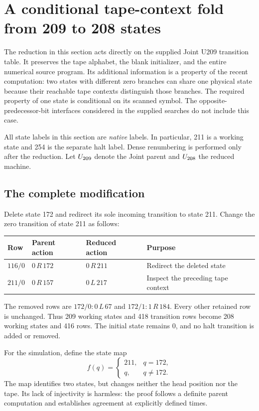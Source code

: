 \section{A conditional tape-context fold from 209 to 208 states}
\label{sec:local208}

The reduction in this section acts directly on the supplied Joint U209
transition table. It preserves the tape alphabet, the blank initializer, and
the entire numerical source program. Its additional information is a property
of the recent computation: two states with different zero branches can share
one physical state because their reachable tape contexts distinguish those
branches. The required property of one state is conditional on its scanned
symbol. The opposite-predecessor-bit interfaces considered in the supplied
searches do not include this case.

All state labels in this section are \emph{native} labels. In particular, 211
is a working state and 254 is the separate halt label. Dense renumbering is
performed only after the reduction. Let $U_{209}$ denote the Joint parent and
$U_{208}$ the reduced machine.

\subsection{The complete modification}
\label{subsec:local208-patch}

Delete state 172 and redirect its sole incoming transition to state 211.
Change the zero transition of state 211 as follows:
\begin{center}
\begin{tabular}{llll}
\toprule
Row & Parent action & Reduced action & Purpose\\
\midrule
$116/0$ & $0\,R\,172$ & $0\,R\,211$ & Redirect the deleted state\\
$211/0$ & $0\,R\,157$ & $0\,L\,217$ & Inspect the preceding tape context\\
\bottomrule
\end{tabular}
\end{center}
The removed rows are $172/0:0\,L\,67$ and $172/1:1\,R\,184$.
Every other retained row is unchanged. Thus 209 working states and 418
transition rows become 208 working states and 416 rows. The initial state
remains 0, and no halt transition is added or removed.

For the simulation, define the state map
\[
 f(q)=\begin{cases}211,&q=172,\\q,&q\ne172.\end{cases}
\]
The map identifies two states, but changes neither the head position nor
the tape. Its lack of injectivity is harmless: the proof follows a definite
parent computation and establishes agreement at explicitly defined times.

